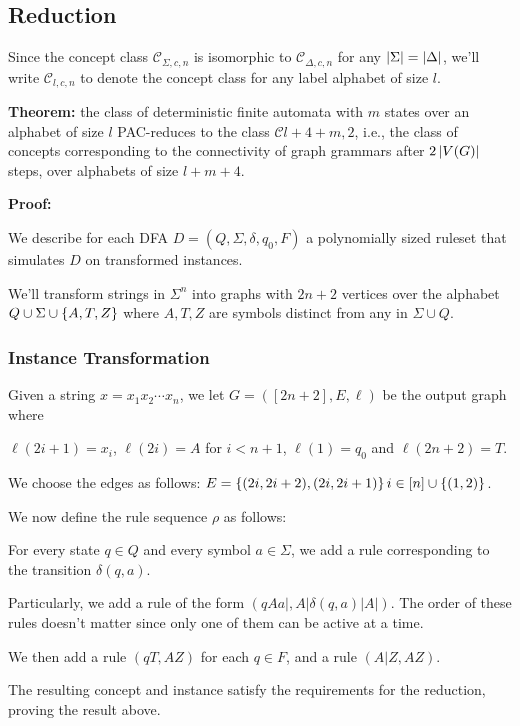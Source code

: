 \documentclass[]{article}
\def\Concepts{\mathcal{C}\xspace}
\begin{document}
\subsection{Reduction}

Since the concept class $\Concepts_{\Sigma,c,n}$ is isomorphic to $\Concepts_{\Delta,c,n}$ for any $\left| \Sigma \right| = \left| \Delta \right|$, we'll write $\Concepts_{l,c,n}$ to denote the concept class for any label alphabet of size $l$. 

\textbf{Theorem:} the class of deterministic finite automata with $m$ states over an alphabet of size $l$ PAC-reduces
to the class $\Concepts{l+4+m,2}$, i.e., the class of concepts corresponding to the connectivity of graph grammars after $2\left| V(G) \right|$ steps, over alphabets of size $l+m+4$.

\textbf{Proof:}

We describe for each DFA $D=(Q,\Sigma,\delta,q_0,F)$ a polynomially sized ruleset that
simulates \(D\) on transformed instances.

We'll transform strings in $\Sigma^n$ into graphs with $2n+2$ vertices over the alphabet $Q\cup\Sigma\cup \left\{ A,T,Z \right\}$ where $A,T,Z$ are symbols distinct from any in $\Sigma\cup Q$.

\subsubsection{Instance Transformation}\label{instance-transformation}

Given a string $x = x_1x_2\dotsm x_n$, we let $G = ([2n+2],E,\ell)$ be the output graph where

$\ell(2i+1) = x_i$, $\ell(2i) = A$ for $i < n+1$, $\ell(1) = q_0$ and $\ell(2n+2) = T$.

We choose the edges as follows: $E = \left\{ (2i,2i+2),(2i,2i+1) \right\}{i\in [n]} \cup \left\{ (1,2) \right\}$.

We now define the rule sequence $\rho$ as follows:

For every state $q\in Q$ and every symbol $a\in \Sigma$, we add a rule corresponding to the transition $\delta(q,a)$.

Particularly, we add a rule of the form $(qAa|, A|\delta(q,a)|A|)$. The order of these rules doesn't matter since only one of them can be active at a time.

We then add a rule $(qT, AZ)$ for each $q\in F$, and a rule $(A|Z,AZ)$.

The resulting concept and instance satisfy the requirements for the reduction, proving the result above.
\end{document}
